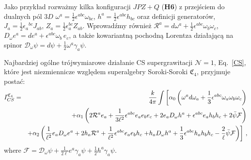 \documentclass[12pt,a4paper]{article}
\begin{document}
Jako przykład rozważmy kilka konfiguracji $JPZ+Q$ (\textbf{H6}) z przejściem do dualnych pól $3D$ $\omega^a=\frac{1}{2}\epsilon^{abc}\omega_{bc}$, $h^a=\frac{1}{2}\epsilon^{abc}h_{bc}$ oraz definicji generatorów, $J_a=\frac{1}{2}\epsilon_{a}{}^{bc}J_{ab}$, $Z_a=\frac{1}{2}\epsilon_{a}^{bc}{}Z_{ab}$. Wprowadźmy również $\mathcal{R}^{a}=d\omega^{a}+\frac{1}{2}\epsilon^{abc}\omega_{b}\omega_{c}$, $D_{\omega}e^{a}=d e^{a}+\epsilon^{abc}\omega_{b}\,e_{c}$, a także kowariantną pochodną Lorentza działającą na spinor $\mathcal{D}_{\omega }\psi=d\psi+\frac{1}{2}\omega^{a}\gamma_{a}\psi$.

Najbardziej ogólne trójwymiarowe działanie CS supergrawitacji $\mathcal{N}=1$, Eq.~\eqref{CS}, które jest niezmiennicze względem superalgebry Soroki-Soroki $\mathfrak{C}_{4}$, przyjmuje postać:
\begin{eqnarray}
	I_{CS}^{\mathfrak{C}_{4}} &=&\frac{k}{4\pi }\int \left[ \alpha _{0}\left(
	\omega ^{a}d\omega _{a}+\frac{1}{3}\epsilon ^{abc}\omega _{a}\omega
	_{b}\omega _{c}\right) \right.  \notag \\
	&&\left. +\alpha _{1}\left( 2\mathcal{R}^{a}e_{a}+\frac{1}{3\ell^2}\epsilon
	^{abc}e_{a}e_{b}e_{c}+2 e_{a}D_{\omega }h^{a}+\epsilon ^{abc}e_{a}h_{b}h_{c}+2
	\bar{\psi}\mathcal{F} \right) \right.  \label{SSCS} \\
	&&+\alpha _{2}\left(\frac{1}{\ell^2}e_{a}D_{\omega }e^{a}+2h_{a}\mathcal{R}
	^{a}+\frac{1}{\ell^2}\epsilon^{abc}e_{a}e_{b}h_{c}\notag\left. +h_{a}D_{\omega }h^{a}+\frac{1}{3}\epsilon ^{abc}h_{a}h_{b}h_{c}-\frac{2}{\ell}\bar{\psi}\mathcal{F} \right) \right] \,,  \label{CSmathfrak_C4}
\end{eqnarray}
where $\mathcal{F}=\mathcal{D}_{\omega }\psi+\frac{1}{2\ell}e^{a}\gamma_{a}\psi+\frac{1}{2}h^{a}\gamma_{a}\psi$. 
\end{document}
